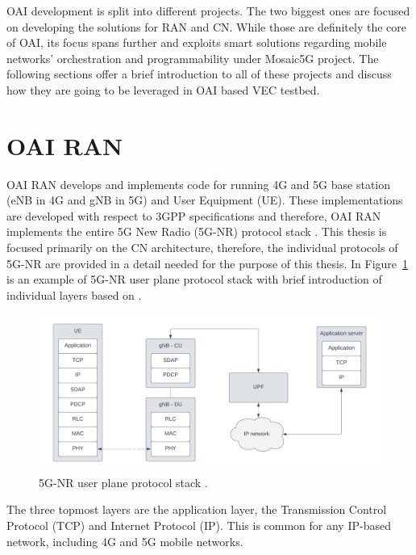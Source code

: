 \documentclass[12pt,a4paper,twoside]{report}
\begin{document}
OAI development is split into different projects. The two biggest ones are focused on developing the solutions for RAN and CN. While those are definitely the core of OAI, its focus spans further and exploits smart solutions regarding mobile networks’ orchestration and programmability under Mosaic5G project. The following sections offer a brief introduction to all of these projects and discuss how they are going to be leveraged in OAI based VEC testbed.
%
\section{OAI RAN}
OAI RAN develops and implements code for running 4G and 5G base station (eNB in 4G and gNB in 5G) and User Equipment (UE). These implementations are developed with respect to 3GPP specifications and therefore, OAI RAN implements the entire 5G New Radio (5G-NR) protocol stack \cite{oai_doc}. This thesis is focused primarily on the CN architecture, therefore, the individual protocols of 5G-NR are provided in a detail needed for the purpose of this thesis. In Figure~\ref{F:5G-protstack} is an example of 5G-NR user plane protocol stack with brief introduction of individual layers based on \cite{dahlman-2020-5g}.
%
\begin{figure}[ht]
	\centering
	\includegraphics[width=13cm]{./images/5G-NR-protstack.png} 
	\caption{5G-NR user plane protocol stack \cite{dahlman-2020-5g}.}
	\label{F:5G-protstack}
\end{figure}
%
The three topmost layers are the application layer, the Transmission Control Protocol (TCP) and Internet Protocol (IP). This is common for any IP-based network, including 4G and 5G mobile networks.
\end{document}
